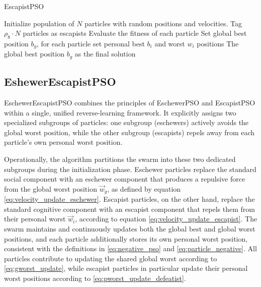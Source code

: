 {\vspace{.935em}
\begin{algorithm}[H]
\caption{EscapistPSO}\label{alg:escapist}
Initialize population of \(N\) particles with random positions and velocities. Tag \(\rho_8 \cdot N\) particles as escapists\;
Evaluate the fitness of each particle\;
Set global best position \(b_g\), for each particle set personal best \(b_i\) and worst \(w_i\) positions\;
\Return The global best position \(b_g\) as the final solution\;
\end{algorithm}



\subsection*{EshewerEscapistPSO}

EschewerEscapistPSO combines the principles of EschewerPSO and EscapistPSO within a single, unified reverse-learning framework. It explicitly assigns two specialized subgroups of particles: one subgroup (eschewers) actively avoids the global worst position, while the other subgroup (escapists) repels away from each particle’s own personal worst position.

Operationally, the algorithm partitions the swarm into these two dedicated subgroups during the initialization phase. Eschewer particles replace the standard social component with an eschewer component that produces a repulsive force from the global worst position $\vec{w}_g$, as defined by equation \eqref{eq:velocity_update_eschewer}. Escapist particles, on the other hand, replace the standard cognitive component with an escapist component that repels them from their personal worst $\vec{w}_i$, according to equation \eqref{eq:velocity_update_escapist}.
The swarm maintains and continuously updates both the global best and global worst positions, and each particle additionally stores its own personal worst position, consistent with the definitions in \eqref{eq:negative_pso} and \eqref{eq:particle_negative}. All particles contribute to updating the shared global worst according to \eqref{eq:gworst_update}, while escapist particles in particular update their personal worst positions according to \eqref{eq:pworst_update_defeatist}.

}
